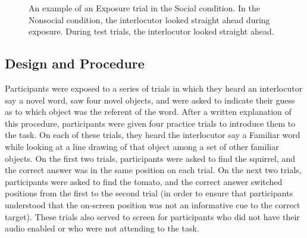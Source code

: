 \documentclass[10pt,letterpaper]{article}
\begin{document}
\begin{figure}[H]
	\centering
	\caption{An example of an Exposure trial in the Social condition. In the Nonsocial condition, the interlocutor looked straight ahead during exposure. During test trials, the interlocutor looked straight ahead.}
\end{figure}

\subsection{Design and Procedure}

Participants were exposed to a series of trials in which they heard an interlocutor say a novel word, saw
four novel objects, and were asked to indicate their guess as to which object was the
referent of the word. After a written explanation of this procedure, participants were given
four practice trials to introduce them to the task. On each of these trials, they heard the interlocutor say a
Familiar word while looking at a line drawing of that object among a set of other familiar objects.
On the first two trials, participants were asked to find the squirrel, and the correct answer
was in the same position on each trial. On the next two trials, participants were asked to
find the tomato, and the correct answer switched positions from the first to the second
trial (in order to ensure that participants understood that the on-screen position was not
an informative cue to the correct target). These trials also served to screen for participants
who did not have their audio enabled or who were not attending to the task.
\end{document}

